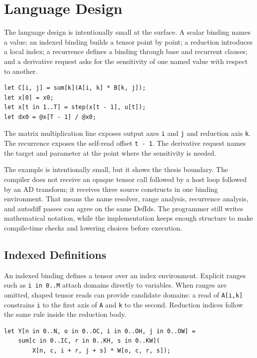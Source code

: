 \chapter{Language Design}

The language design is intentionally small at the surface. A scalar binding
names a value; an indexed binding builds a tensor point by point; a reduction
introduces a local index; a recurrence defines a binding through base and
recurrent clauses; and a derivative request asks for the sensitivity of one
named value with respect to another.

\begin{lstlisting}[style=einlang]
let C[i, j] = sum[k](A[i, k] * B[k, j]);
let x[0] = x0;
let x[t in 1..T] = step(x[t - 1], u[t]);
let dx0 = @x[T - 1] / @x0;
\end{lstlisting}

The matrix multiplication line exposes output axes \texttt{i} and \texttt{j}
and reduction axis \texttt{k}. The recurrence exposes the self-read offset
\texttt{t - 1}. The derivative request names the target and parameter at the
point where the sensitivity is needed.

The example is intentionally small, but it shows the thesis boundary. The
compiler does not receive an opaque tensor call followed by a host loop followed
by an AD transform; it receives three source constructs in one binding
environment. That means the name resolver, range analysis, recurrence analysis,
and autodiff passes can agree on the same DefIds. The programmer still writes
mathematical notation, while the implementation keeps enough structure to make
compile-time checks and lowering choices before execution.

\section{Indexed Definitions}

An indexed binding defines a tensor over an index environment. Explicit ranges
such as \texttt{i in 0..M} attach domains directly to variables. When ranges are
omitted, shaped tensor reads can provide candidate domains: a read of
\texttt{A[i,k]} constrains \texttt{i} to the first axis of \texttt{A} and
\texttt{k} to the second. Reduction indices follow the same rule inside the
reduction body.

\begin{lstlisting}[style=einlang]
let Y[n in 0..N, o in 0..OC, i in 0..OH, j in 0..OW] =
    sum[c in 0..IC, r in 0..KH, s in 0..KW](
        X[n, c, i + r, j + s] * W[o, c, r, s]);
\end{lstlisting}

